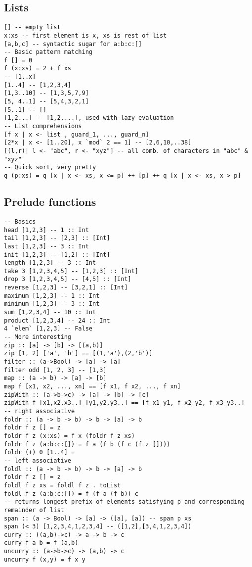 \documentclass[11.5pt]{article}
\begin{document}
\subsection{Lists}
\begin{verbatim}
[] -- empty list
x:xs -- first element is x, xs is rest of list
[a,b,c] -- syntactic sugar for a:b:c:[]
-- Basic pattern matching
f [] = 0
f (x:xs) = 2 + f xs
-- [1..x]
[1..4] -- [1,2,3,4]
[1,3..10] -- [1,3,5,7,9]
[5, 4..1] -- [5,4,3,2,1] 
[5..1] -- []
[1,2...] -- [1,2,...], used with lazy evaluation
-- List comprehensions
[f x | x <- list , guard_1, ..., guard_n]
[2*x | x <- [1..20], x `mod` 2 == 1] -- [2,6,10,..38]
[(l,r)| l <- "abc", r <- "xyz"] -- all comb. of characters in "abc" & "xyz"
-- Quick sort, very pretty
q (p:xs) = q [x | x <- xs, x <= p] ++ [p] ++ q [x | x <- xs, x > p]
\end{verbatim}

\subsection{Prelude functions}
\begin{verbatim}
-- Basics
head [1,2,3] -- 1 :: Int
tail [1,2,3] -- [2,3] :: [Int]
last [1,2,3] -- 3 :: Int
init [1,2,3] -- [1,2] :: [Int]
length [1,2,3] -- 3 :: Int
take 3 [1,2,3,4,5] -- [1,2,3] :: [Int]
drop 3 [1,2,3,4,5] -- [4,5] :: [Int]
reverse [1,2,3] -- [3,2,1] :: [Int]
maximum [1,2,3] -- 1 :: Int
minimum [1,2,3] -- 3 :: Int
sum [1,2,3,4] -- 10 :: Int
product [1,2,3,4] -- 24 :: Int
4 `elem` [1,2,3] -- False
-- More interesting
zip :: [a] -> [b] -> [(a,b)]
zip [1, 2] ['a', 'b'] == [(1,'a'),(2,'b')]
filter :: (a->Bool) -> [a] -> [a]
filter odd [1, 2, 3] -- [1,3]
map :: (a -> b) -> [a] -> [b]
map f [x1, x2, ..., xn] == [f x1, f x2, ..., f xn]
zipWith :: (a->b->c) -> [a] -> [b] -> [c]
zipWith f [x1,x2,x3..] [y1,y2,y3..] == [f x1 y1, f x2 y2, f x3 y3..]
-- right associative
foldr :: (a -> b -> b) -> b -> [a] -> b
foldr f z [] = z
foldr f z (x:xs) = f x (foldr f z xs)
foldr f z (a:b:c:[]) = f a (f b (f c (f z [])))
foldr (+) 0 [1..4] = 
-- left associative
foldl :: (a -> b -> b) -> b -> [a] -> b
foldr f z [] = z
foldl f z xs = foldl f z . toList
foldl f z (a:b:c:[]) = f (f a (f b)) c
-- returns longest prefix of elements satisfying p and corresponding remainder of list
span :: (a -> Bool) -> [a] -> ([a], [a]) -- span p xs
span (< 3) [1,2,3,4,1,2,3,4] -- ([1,2],[3,4,1,2,3,4])
curry :: ((a,b)->c) -> a -> b -> c
curry f a b = f (a,b)
uncurry :: (a->b->c) -> (a,b) -> c
uncurry f (x,y) = f x y
\end{verbatim}
\end{document}
